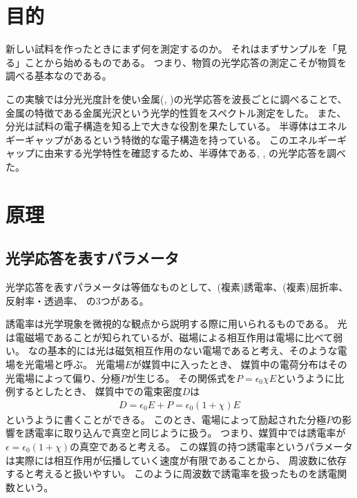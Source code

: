 \documentclass[11pt,dvipdfmx,a4paper]{jsarticle}
\begin{document}
\section{目的}
新しい試料を作ったときにまず何を測定するのか。
それはまずサンプルを「見る」ことから始めるものである。
つまり、物質の光学応答の測定こそが物質を調べる基本なのである。

この実験では分光光度計を使い金属(, )の光学応答を波長ごとに調べることで、
金属の特徴である金属光沢という光学的性質をスペクトル測定をした。
また、分光は試料の電子構造を知る上で大きな役割を果たしている。
半導体はエネルギーギャップがあるという特徴的な電子構造を持っている。
このエネルギーギャップに由来する光学特性を確認するため、半導体である, , の光学応答を調べた。


\section{原理}
\subsection{光学応答を表すパラメータ}
光学応答を表すパラメータは等価なものとして、(複素)誘電率、(複素)屈折率、反射率・透過率、
の3つがある。

誘電率は光学現象を微視的な観点から説明する際に用いられるものである。
光は電磁場であることが知られているが、磁場による相互作用は電場に比べて弱い。
なの基本的には光は磁気相互作用のない電場であると考え、そのような電場を光電場と呼ぶ。
光電場\(E\)が媒質中に入ったとき、
媒質中の電荷分布はその光電場によって偏り、分極\(P\)が生じる。
その関係式を\(P = \epsilon_0\chi E\)というように比例するとしたとき、
媒質中での電束密度\(D\)は
\begin{align}
    D = \epsilon_0 E + P = \epsilon_0(1+\chi)E
\end{align}
というように書くことができる。
このとき、電場によって励起された分極\(P\)の影響を誘電率に取り込んで真空と同じように扱う。
つまり、媒質中では誘電率が\(\epsilon=\epsilon_0 (1+\chi)\)の真空であると考える。
この媒質の持つ誘電率というパラメータは実際には相互作用が伝播していく速度が有限であることから、
周波数に依存すると考えると扱いやすい。
このように周波数で誘電率を扱ったものを誘電関数という。
\end{document}
